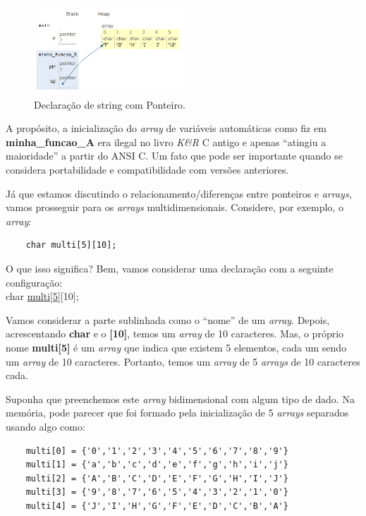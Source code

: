 \begin{figure}[ht]
	\begin{center}
		\includegraphics[width=0.5\textwidth]{Pictures/mempointer}
		\caption{Declaração de string com Ponteiro.}
		\label{fig:mempointer}
	\end{center}
\end{figure}

A propósito, a inicialização do \textit{array} de variáveis automáticas como fiz em \textbf{minha\_funcao\_A} era ilegal no livro \textit{K\&R} C antigo e apenas ``atingiu a maioridade'' a partir do ANSI C. Um fato que pode ser importante quando se considera portabilidade e compatibilidade com versões anteriores.

Já que estamos discutindo o relacionamento/diferenças entre ponteiros e \textit{arrays}, vamos prosseguir para os \textit{arrays} multidimensionais. Considere, por exemplo, o \textit{array}:
\begin{lstlisting}
	char multi[5][10];
\end{lstlisting}

O que isso significa? Bem, vamos considerar uma declaração com a seguinte configuração:\\  	char \underline{multi[5]}[10];

Vamos considerar a parte sublinhada como o ``nome'' de um \textit{array}. Depois, acrescentando \textbf{char} e o \textbf{[10]}, temos um \textit{array} de 10 caracteres. Mas, o próprio nome \textbf{multi[5]} é um \textit{array} que indica que existem 5 elementos, cada um sendo um \textit{array} de 10 caracteres. Portanto, temos um \textit{array} de 5 \textit{arrays} de 10 caracteres cada.

Suponha que preenchemos este \textit{array} bidimensional com algum tipo de dado. Na memória, pode parecer que foi formado pela inicialização de 5 \textit{arrays} separados usando algo como:
\begin{lstlisting}
	multi[0] = {'0','1','2','3','4','5','6','7','8','9'}
	multi[1] = {'a','b','c','d','e','f','g','h','i','j'}
	multi[2] = {'A','B','C','D','E','F','G','H','I','J'}
	multi[3] = {'9','8','7','6','5','4','3','2','1','0'}
	multi[4] = {'J','I','H','G','F','E','D','C','B','A'}
\end{lstlisting}


